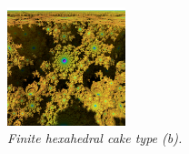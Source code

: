 \documentclass[suppldata, dvipdfmx]{interact}
\theoremstyle{plain}%
\theoremstyle{definition}
\theoremstyle{remark}
\theoremstyle{problemstyle}
\begin{document}
\begin{figure}[H]
\begin{minipage}{0.5\textwidth}
  \begin{minipage}[t]{0.24\textwidth}
   \centering
   \includegraphics[width=1.35in, height=1.35in,
   keepaspectratio]{./img/sphairahedron/hexahedralCake2/limitsetInf_b.png} 
  \end{minipage}
  \hspace*{\fill}
  \caption{\textit{Finite hexahedral cake type (b).}}
  \label{}
 \end{minipage}
\end{figure}
\end{document}
